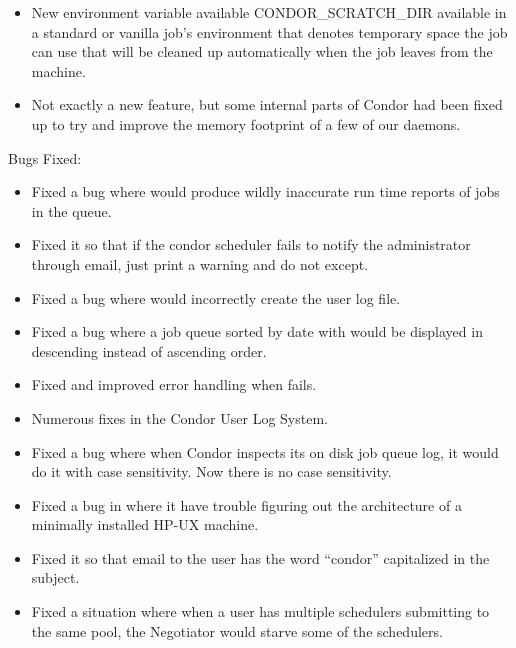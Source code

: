 \begin{itemize}
\item New environment variable available CONDOR\_SCRATCH\_DIR available
in a standard or vanilla job's environment that denotes temporary space
the job can use that will be cleaned up automatically when the job leaves
from the machine.

\item Not exactly a new feature, but some internal parts of Condor had been
fixed up to try and improve the memory footprint of a few of our daemons.

\end{itemize}

\noindent Bugs Fixed:
\begin{itemize}

\item Fixed a bug where  would produce wildly inaccurate run time
reports of jobs in the queue.

\item Fixed it so that if the condor scheduler fails to notify the
administrator through email, just print a warning and do not except.

\item Fixed a bug where  would incorrectly create the user
log file.

\item Fixed a bug where a job queue sorted by date with  would
be displayed in descending instead of ascending order.

\item Fixed and improved error handling when  fails.

\item Numerous fixes in the Condor User Log System.

\item Fixed a bug where when Condor inspects its on disk job queue log,
it would do it with case sensitivity. Now there is no case sensitivity.

\item Fixed a bug in  where it have trouble figuring out
the architecture of a minimally installed HP-UX machine.

\item Fixed it so that email to the user has the word ``condor'' capitalized
in the subject.

\item Fixed a situation where when a user has multiple schedulers submitting
to the same pool, the Negotiator would starve some of the schedulers.


\end{itemize}
